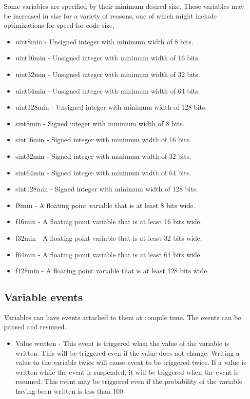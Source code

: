 \documentclass[12pt]{article}
\begin{document}
Some variables are specified by their minimum desired size. These variables may be increased in size for a variety of reasons, one of which might include optimizations for speed for code size.

\begin{itemize}
\item uint8min - Unsigned integer with minimum width of 8 bits.
\item uint16min - Unsigned integer with minimum width of 16 bits.
\item uint32min - Unsigned integer with minimum width of 32 bits.
\item uint64min - Unsigned integer with minimum width of 64 bits.
\item uint128min - Unsigned integer with minimum width of 128 bits.
\item sint8min - Signed integer with minimum width of 8 bits.
\item sint16min - Signed integer with minimum width of 16 bits.
\item sint32min - Signed integer with minimum width of 32 bits.
\item sint64min - Signed integer with minimum width of 64 bits.
\item sint128min - Signed integer with minimum width of 128 bits.
\item f8min - A floating point variable that is at least 8 bits wide.
\item f16min - A floating point variable that is at least 16 bits wide.
\item f32min - A floating point variable that is at least 32 bits wide.
\item f64min - A floating point variable that is at least 64 bits wide.
\item f128min - A floating point variable that is at least 128 bits wide.
\end{itemize}

\subsection {Variable events}
Variables can have events attached to them at compile time. The events can be paused and resumed.
\begin{itemize}
\item Value written - This event is triggered when the value of the variable is written. This will be triggered even if the value does not change. Writing a value to the variable twice will cause event to be triggered twice. If a value is written while the event is suspended, it will be triggered when the event is resumed. This event may be triggered even if the probability of the variable having been written is less than 100%
\end{itemize}
\end{document}
